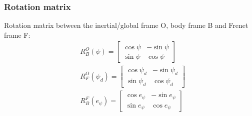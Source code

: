 \documentclass[12pt]{article}
\begin{document}
        \subsubsection{Rotation matrix}
            Rotation matrix between the inertial/global frame O, body frame B and Frenet frame F:
            \begin{equation}
                \begin{aligned}
                    & R_B^O(\psi) = \begin{bmatrix} \cos{\psi} & -\sin{\psi} \\ \sin{\psi} & \cos{\psi} \end{bmatrix}  \\
                    & R_F^O(\psi_d) = \begin{bmatrix} \cos{\psi_d} & -\sin{\psi_d} \\ \sin{\psi_d} & \cos{\psi_d} \end{bmatrix} \\
                    & R_B^F(e_{\psi}) = \begin{bmatrix} \cos{e_{\psi}} & -\sin{e_{\psi}} \\ \sin{e_{\psi}} & \cos{e_{\psi}} \end{bmatrix} \\
                \end{aligned}
            \end{equation}
\end{document}
